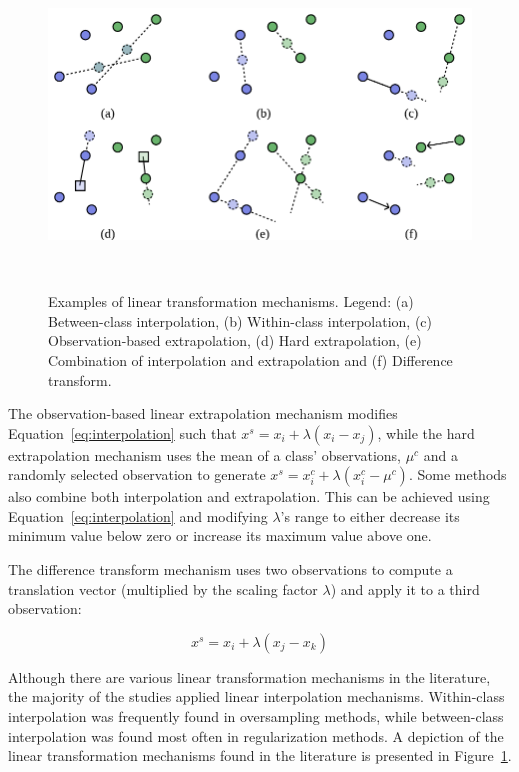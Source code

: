 \begin{figure}
	\centering
	\includegraphics[width=.7\linewidth]{figures/synthetic-data-review/linear-transformations}
    \caption[Examples of linear transformation mechanisms.]{%
        Examples of linear transformation mechanisms. Legend: (a)
        Between-class interpolation, (b) Within-class interpolation, (c)
        Observation-based extrapolation, (d) Hard extrapolation, (e)
        Combination of interpolation and extrapolation and (f) Difference
        transform.
    }~\label{fig:linear-transformations}
\end{figure}

The observation-based linear extrapolation mechanism modifies
Equation~\ref{eq:interpolation} such that $x^s = x_i + \lambda(x_i - x_j)$,
while the hard extrapolation mechanism uses the mean of a class' observations,
$\mu^c$ and a randomly selected observation to generate $x^s = x_i^c +
\lambda(x_i^c - \mu^c)$. Some methods also combine both interpolation and
extrapolation. This can be achieved using Equation~\ref{eq:interpolation} and
modifying $\lambda$'s range to either decrease its minimum value below zero
or increase its maximum value above one.

The difference transform mechanism uses two observations to compute a
translation vector (multiplied by the scaling factor $\lambda$) and apply it
to a third observation:

\begin{equation}
    x^s = x_i + \lambda(x_j - x_k)
\end{equation}

Although there are various linear transformation mechanisms in the literature,
the majority of the studies applied linear interpolation mechanisms.
Within-class interpolation was frequently found in oversampling methods, while
between-class interpolation was found most often in regularization methods. A
depiction of the linear transformation mechanisms found in the literature
is presented in Figure~\ref{fig:linear-transformations}.

